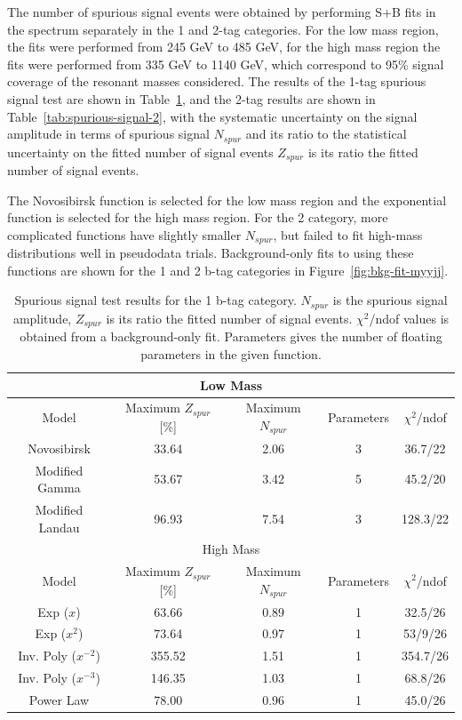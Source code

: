 The number of spurious signal events were obtained by performing S+B fits in the \myybb spectrum separately in the 1 and 2-tag categories. For the low mass region, the fits were performed from 245 GeV to 485 GeV, for the high mass region the fits were performed from 335 GeV to 1140 GeV, which correspond to 95\% signal coverage of the resonant masses considered. The results of the 1-tag spurious signal test are shown in Table~\ref{tab:spurious-signal-1}, and the 2-tag results are shown in Table~\ref{tab:spurious-signal-2}, with the systematic uncertainty on the signal amplitude in terms of spurious signal $N_{spur}$ and its ratio to the statistical uncertainty on the fitted number of signal events $Z_{spur}$ is its ratio the fitted number of signal events.

The Novosibirsk function is selected for the low mass region and the exponential function is selected for the high mass region. For the 2 \btag category, more complicated functions have slightly smaller $N_{spur}$, but failed to fit high-mass distributions well in pseudodata trials. Background-only fits to using these functions are shown for the 1 and 2 b-tag categories in Figure~\ref{fig:bkg-fit-myyjj}.

\begin{table}[!h]
  \centering
  \caption[Spurious signal test results for the 1 b-tag category]{Spurious signal test results for the 1 b-tag category. $N_{spur}$ is the spurious signal amplitude, $Z_{spur}$ is its ratio the fitted number of signal events. $\chi^2$/ndof values is obtained from a background-only fit. Parameters gives the number of floating parameters in the given function.}
  \label{tab:spurious-signal-1}
  \begin{tabular}{|c|c|c|c|c|}
    \hline
    \multicolumn{5}{|c|}{Low Mass}\\
    \hline
    Model     &   Maximum $Z_{spur}$ [\%]      &      Maximum $N_{spur}$      &   Parameters     &    $\chi^2$/ndof \\
    \hline
    Novosibirsk        & 33.64    &   2.06  & 3  & 36.7/22 \\
    Modified Gamma     & 53.67    &   3.42  & 5  & 45.2/20 \\
    Modified Landau    & 96.93    &   7.54  & 3  & 128.3/22 \\
    \hline
    \multicolumn{5}{|c|}{High Mass}\\
    \hline
    Model     &   Maximum $Z_{spur}$ [\%]      &      Maximum $N_{spur}$      &   Parameters     &    $\chi^2$/ndof \\
    \hline
    Exp ($x$)             &  63.66    &  0.89  & 1  & 32.5/26 \\
    Exp ($x^2$)           &  73.64    &  0.97  & 1  & 53/9/26 \\
    Inv. Poly ($x^{-2}$)    &  355.52   &  1.51  & 1  & 354.7/26 \\
    Inv. Poly ($x^{-3}$)    &  146.35   &  1.03  & 1  & 68.8/26 \\
    Power Law             &  78.00    &  0.96  & 1  & 45.0/26 \\
    \hline    
  \end{tabular}
\end{table}

